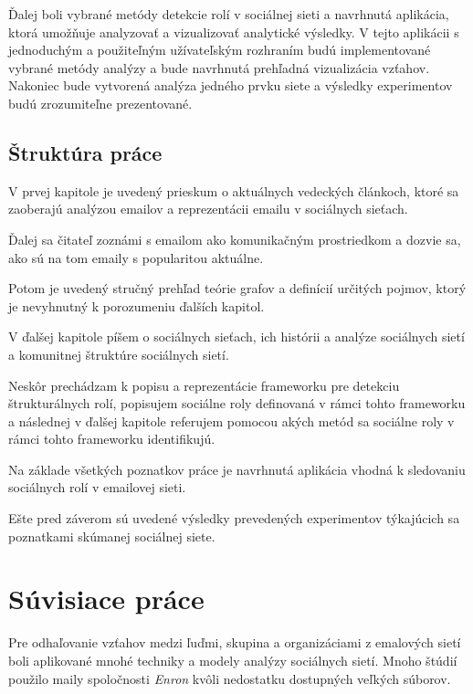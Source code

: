 \documentclass[slovak,master,public,dept460,male,cpdeclaration,oneside]{diploma}
\begin{document}
Ďalej boli vybrané metódy detekcie rolí v sociálnej sieti a navrhnutá aplikácia, ktorá umožňuje analyzovať a vizualizovať analytické výsledky. V tejto aplikácii s jednoduchým a použiteľným užívateľským rozhraním budú implementované vybrané metódy analýzy a bude navrhnutá prehľadná vizualizácia vzťahov. Nakoniec bude vytvorená analýza jedného prvku siete a výsledky experimentov budú zrozumiteľne prezentované.

\subsection{Štruktúra práce}
V prvej kapitole je uvedený prieskum o aktuálnych vedeckých článkoch, ktoré sa zaoberajú analýzou emailov a reprezentácii emailu v sociálnych sieťach.

Ďalej sa čitateľ zoznámi s emailom ako komunikačným prostriedkom a dozvie sa, ako sú na tom emaily s popularitou aktuálne. 
 
Potom je uvedený stručný prehľad teórie grafov a definícií určitých pojmov, ktorý je nevyhnutný k porozumeniu ďalších kapitol.
 
V ďalšej kapitole píšem o sociálnych sieťach, ich histórii a analýze sociálnych sietí a komunitnej štruktúre sociálnych sietí.

Neskôr prechádzam k popisu a reprezentácie frameworku pre detekciu štrukturálnych rolí, popisujem sociálne roly definovaná v rámci tohto frameworku a následnej v ďalšej kapitole referujem pomocou akých metód sa sociálne roly v rámci tohto frameworku identifikujú.

Na základe všetkých poznatkov práce je navrhnutá aplikácia vhodná k sledovaniu sociálnych rolí v emailovej sieti. 

Ešte pred záverom sú uvedené výsledky prevedených experimentov týkajúcich sa poznatkami skúmanej sociálnej siete.


\section{Súvisiace práce}

Pre odhaľovanie vzťahov medzi ľuďmi, skupina a organizáciami z emalových sietí boli aplikované mnohé techniky a modely analýzy sociálnych sietí. Mnoho štúdií použilo maily spoločnosti \textit{Enron} kvôli nedostatku dostupných veľkých súborov. 
\end{document}
